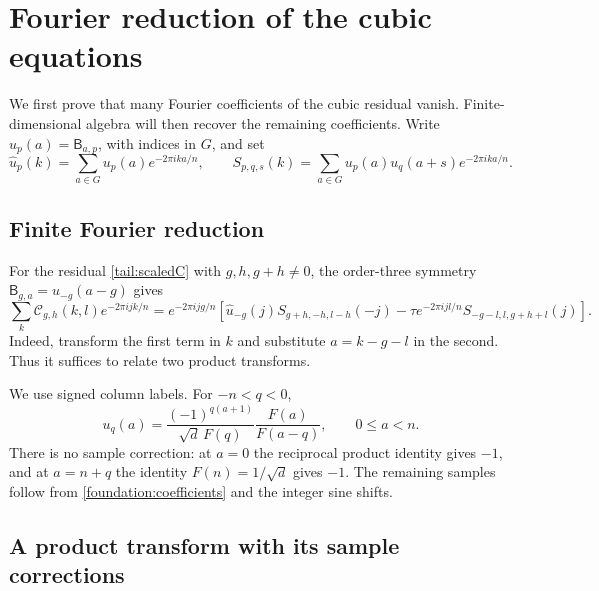 \section{Fourier reduction of the cubic equations}
\label{an:products}

We first prove that many Fourier coefficients of the cubic residual
vanish.  Finite-dimensional algebra will then recover the remaining
coefficients.  Write $u_p(a)=\mathsf B_{a,p}$,
with indices in $G$, and set
\[
 \widehat u_p(k)=\sum_{a\in G}u_p(a)e^{-2\pi ika/n},\qquad
 S_{p,q,s}(k)=\sum_{a\in G}u_p(a)u_q(a+s)e^{-2\pi ika/n}.
\]
\subsection{Finite Fourier reduction}

For the residual \eqref{tail:scaledC} with $g,h,g+h\ne0$,
the order-three symmetry $\mathsf B_{g,a}=u_{-g}(a-g)$ gives
\begin{equation}
 \sum_k\mathcal C_{g,h}(k,l)e^{-2\pi ijk/n}
 =e^{-2\pi ijg/n}\left[
  \widehat u_{-g}(j)S_{g+h,-h,l-h}(-j)
       -\tau e^{-2\pi ijl/n}S_{-g-l,l,g+h+l}(j)\right].
\label{an:finite}
\end{equation}
Indeed, transform the first term in $k$ and substitute $a=k-g-l$
in the second.  Thus it suffices to relate two product transforms.

We use signed column labels.  For $-n<q<0$,
\begin{equation}
 u_q(a)=\frac{(-1)^{q(a+1)}}{\sqrt d\,F(q)}
                      \frac{F(a)}{F(a-q)},\qquad 0\le a<n.
 \label{an:signed}
\end{equation}
There is no sample correction: at $a=0$ the reciprocal product identity gives
$-1$, and at $a=n+q$ the identity $F(n)=1/\sqrt d$ gives $-1$.
The remaining samples follow from \eqref{foundation:coefficients} and the
integer sine shifts.

\subsection{A product transform with its sample corrections}

